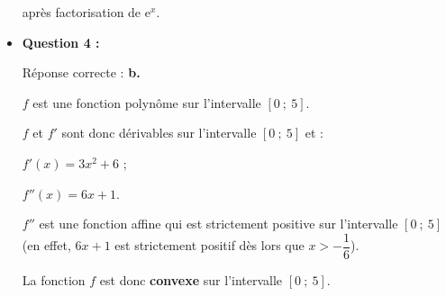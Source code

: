 \begin{corrige}
\begin{itemize}
          après factorisation de $\text{e}^{x}$.
          \par
          \item \textbf{Question 4 :}
          \par
          Réponse correcte :\quad\textbf{ b.}
          \par
          $f$ est une fonction polynôme sur l'intervalle $[0~;~5]$.
          \par
          $f$ et $f'$ sont donc dérivables sur l'intervalle $[0~;~5]$ et :
          \par
          $f'(x)=3x^2+6$ ;
          \par
          $f''(x)=6x+1$.
          \par
          $f''$ est une fonction affine qui est strictement positive sur l'intervalle $[0~;~5]$ (en effet, $6x+1$ est strictement positif dès lors que $x>-\dfrac{1}{6}$).
          \par
          La fonction $f$ est donc \textbf{convexe} sur l'intervalle $[0~;~5]$.
          \par
     \end{itemize}
\end{corrige}

